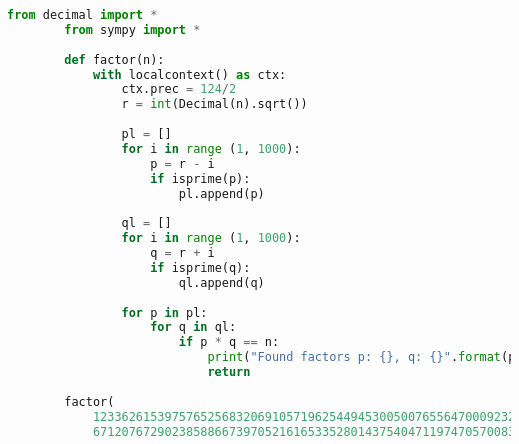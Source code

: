 \documentclass{article}
\begin{document}
    \begin{lstlisting}[language=Python]
        from decimal import *
        from sympy import *
        
        def factor(n):
            with localcontext() as ctx:
                ctx.prec = 124/2
                r = int(Decimal(n).sqrt())
        
                pl = []
                for i in range (1, 1000):
                    p = r - i
                    if isprime(p):
                        pl.append(p)
        
                ql = []
                for i in range (1, 1000):
                    q = r + i
                    if isprime(q):
                        ql.append(q)
                
                for p in pl:
                    for q in ql:
                        if p * q == n:
                            print("Found factors p: {}, q: {}".format(p, q))
                            return
        
        factor(
            12336261539757652568320691057196254494530050076556470009232333
            67120767290238588667397052161653352801437540471197470570083267)
    \end{lstlisting}
\end{document}
